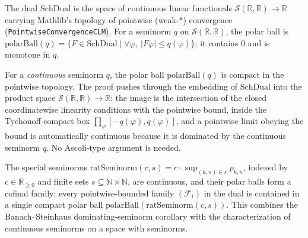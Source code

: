 \begin{definition}\label{def:mit-polar-ball}
  \leanok
  The dual $\mathrm{SchDual}$ is the space of continuous linear functionals
  $\mathcal{S}(\mathbb{R},\mathbb{R}) \to \mathbb{R}$ carrying Mathlib's topology of pointwise
  (weak-$*$) convergence (\texttt{PointwiseConvergenceCLM}).  For a seminorm $q$ on $\mathcal{S}(\mathbb{R},\mathbb{R})$, the polar
  ball is $\mathrm{polarBall}(q) = \{F \in \mathrm{SchDual} \mid \forall \varphi,\ |F\varphi| \le
  q(\varphi)\}$; it contains $0$ and is monotone in $q$.
\end{definition}

\begin{theorem}\label{thm:mit-polar-compact}
  \leanok
  For a \emph{continuous} seminorm $q$, the polar ball $\mathrm{polarBall}(q)$ is compact in the
  pointwise topology.  The proof pushes through the embedding of $\mathrm{SchDual}$ into the product
  space $\mathcal{S}(\mathbb{R},\mathbb{R}) \to \mathbb{R}$: the image is the intersection of the
  closed coordinatewise linearity conditions with the pointwise bound, inside the Tychonoff-compact
  box $\prod_\varphi [-q(\varphi), q(\varphi)]$, and a pointwise limit obeying the bound is
  automatically continuous because it is dominated by the continuous seminorm $q$.  No Ascoli-type
  argument is needed.
\end{theorem}

\begin{proposition}\label{prop:mit-rat-cofinal}
  \leanok
  The special seminorms $\mathrm{ratSeminorm}(c, s) = c \cdot \sup_{(k,n) \in s} p_{k,n}$, indexed
  by $c \in \mathbb{R}_{\ge 0}$ and finite sets $s \subseteq \mathbb{N} \times \mathbb{N}$, are
  continuous, and their polar balls form a cofinal family: every pointwise-bounded family
  $(\mathcal{F}_i)$ in the dual is contained in a single compact polar ball
  $\mathrm{polarBall}(\mathrm{ratSeminorm}(c,s))$.  This combines the Banach--Steinhaus
  dominating-seminorm corollary with the characterization of continuous seminorms on a space with
  seminorms.
\end{proposition}

